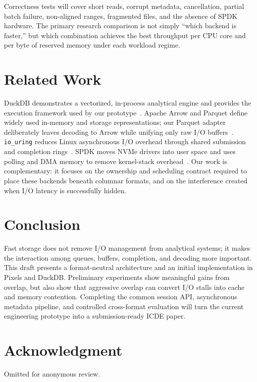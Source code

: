 \documentclass[conference]{IEEEtran}
\begin{document}
Correctness tests will cover short reads, corrupt metadata, cancellation,
partial batch failure, non-aligned ranges, fragmented files, and the absence of
SPDK hardware.  The primary research comparison is not simply ``which backend
is faster,'' but which combination achieves the best throughput per CPU core
and per byte of reserved memory under each workload regime.

\section{Related Work}

DuckDB demonstrates a vectorized, in-process analytical engine and provides
the execution framework used by our prototype~\cite{duckdb}.  Apache Arrow and
Parquet define widely used in-memory and storage representations; our Parquet
adapter deliberately leaves decoding to Arrow while unifying only raw I/O
buffers~\cite{arrow,parquet}.  \texttt{io\_uring} reduces Linux asynchronous
I/O overhead through shared submission and completion rings~\cite{iouring}.
SPDK moves NVMe drivers into user space and uses polling and DMA memory to
remove kernel-stack overhead~\cite{spdk}.  Our work is complementary: it
focuses on the ownership and scheduling contract required to place these
backends beneath columnar formats, and on the interference created when I/O
latency is successfully hidden.


\section{Conclusion}

Fast storage does not remove I/O management from analytical systems; it makes
the interaction among queues, buffers, completion, and decoding more important.
This draft presents a format-neutral architecture and an initial implementation
in Pixels and DuckDB.  Preliminary experiments show meaningful gains from
overlap, but also show that aggressive overlap can convert I/O stalls into
cache and memory contention.  Completing the common session API, asynchronous
metadata pipeline, and controlled cross-format evaluation will turn the
current engineering prototype into a submission-ready ICDE paper.

\section*{Acknowledgment}

Omitted for anonymous review.



\end{document}
